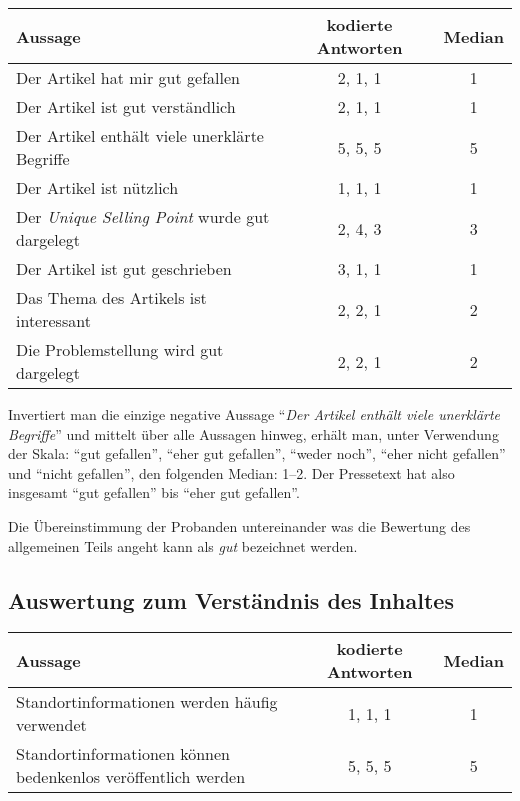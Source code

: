 \begin{table}[!ht]
    \begin{center}
        \begin{tabular}{lcc}
        \toprule
        \textbf{Aussage} & \textbf{kodierte Antworten} & \textbf{Median} \\
        \midrule
        Der Artikel hat mir gut gefallen & 2, 1, 1 & 1 \\
        Der Artikel ist gut verständlich & 2, 1, 1 & 1 \\
        Der Artikel enthält viele unerklärte Begriffe & 5, 5, 5 & 5 \\
        Der Artikel ist nützlich & 1, 1, 1 & 1 \\
        Der \emph{Unique Selling Point} wurde gut dargelegt & 2, 4, 3 & 3 \\
        Der Artikel ist gut geschrieben & 3, 1, 1 & 1 \\
        Das Thema des Artikels ist interessant & 2, 2, 1 & 2 \\
        Die Problemstellung wird gut dargelegt & 2, 2, 1 & 2 \\
        \bottomrule
        \end{tabular}
    \end{center}
\end{table}

Invertiert man die einzige negative Aussage \enquote{\emph{Der Artikel enthält
viele unerklärte Begriffe}} und mittelt über alle Aussagen hinweg, erhält man,
unter Verwendung der Skala: \enquote{gut gefallen}, \enquote{eher gut
gefallen}, \enquote{weder noch}, \enquote{eher nicht gefallen} und
\enquote{nicht gefallen}, den folgenden Median: 1--2.
Der Pressetext hat also insgesamt \enquote{gut gefallen} bis \enquote{eher gut gefallen}.

Die Übereinstimmung der Probanden untereinander was die Bewertung des
allgemeinen Teils angeht kann als \emph{gut} bezeichnet werden.


\subsection{Auswertung zum Verständnis des Inhaltes}

\begin{table}[!ht]
    \begin{center}
        \begin{tabular}{p{8cm}cc}
        \toprule
        \textbf{Aussage} & \textbf{kodierte Antworten} & \textbf{Median} \\
        \midrule
        Standortinformationen werden häufig verwendet & 1, 1, 1 & 1 \\
        \addlinespace
        Standortinformationen können bedenkenlos veröffentlich werden  & 5, 5, 5 & 5 \\
        \bottomrule
        \end{tabular}
    \end{center}
\end{table}


